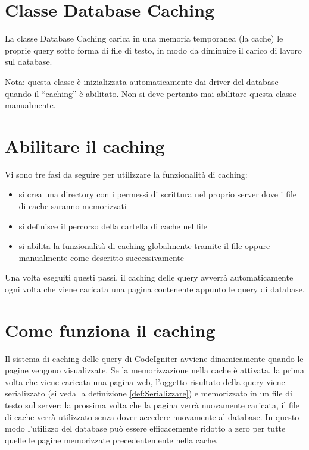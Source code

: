 \section*{Classe Database Caching}
La classe Database Caching carica in una memoria temporanea (la cache) le proprie query sotto forma di file di testo, in modo da diminuire il carico di lavoro sul database.

Nota: questa classe è inizializzata automaticamente dai driver del database quando il ``caching'' è abilitato. Non si deve pertanto mai abilitare questa classe manualmente.

\section*{Abilitare il caching}
Vi sono tre fasi da seguire per utilizzare la funzionalità di caching:

\begin{itemize}
\item si crea una directory con i permessi di scrittura nel proprio server dove i file di cache saranno memorizzati
\item si definisce il percorso della cartella di cache nel file 
\item si abilita la funzionalità di caching globalmente tramite il file  oppure manualmente come descritto successivamente
\end{itemize}

Una volta eseguiti questi passi, il caching  delle query avverrà automaticamente ogni volta che viene caricata una pagina contenente appunto le query di database.

\section*{Come funziona il caching}
Il sistema di caching delle query di CodeIgniter avviene dinamicamente quando le pagine vengono visualizzate. Se la memorizzazione nella cache è attivata, la prima volta che viene caricata una pagina web, l'oggetto risultato della query viene serializzato (si veda la definizione \vref{def:Serializzare}) e memorizzato in un file di testo sul server: la prossima volta che la pagina verrà nuovamente caricata, il file di cache verrà utilizzato senza dover accedere nuovamente al database. In questo modo l'utilizzo del database può essere efficacemente ridotto a zero per tutte quelle le pagine memorizzate precedentemente nella cache.

